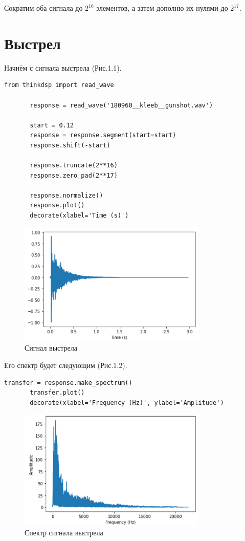 \documentclass[a4paper,12pt]{report}
\begin{document}
    Сократим оба сигнала до $2^{16}$ элементов, а затем дополню их нулями до $2^{17}$.
    
\section{Выстрел}      
    Начнём с сигнала выстрела (Рис.1.1).
\begin{lstlisting}[caption=Дополнение нулями]
       from thinkdsp import read_wave

       response = read_wave('180960__kleeb__gunshot.wav')

       start = 0.12
       response = response.segment(start=start)
       response.shift(-start)

       response.truncate(2**16)
       response.zero_pad(2**17)

       response.normalize()
       response.plot()
       decorate(xlabel='Time (s)')
\end{lstlisting}
\begin{figure}[H]
        \centering
        \includegraphics[width=0.8\textwidth]{fig1-1.PNG}
        \caption{Сигнал выстрела}
        \label{fig:fig1-1}
\end{figure}

    Его спектр будет следующим (Рис.1.2).
\begin{lstlisting}[caption=Получение спектра сигнала]
       transfer = response.make_spectrum()
       transfer.plot()
       decorate(xlabel='Frequency (Hz)', ylabel='Amplitude')
\end{lstlisting}
\begin{figure}[H]
        \centering
        \includegraphics[width=0.8\textwidth]{fig1-2.PNG}
        \caption{Спектр сигнала выстрела}
        \label{fig:fig1-2}
\end{figure}   
\end{document}
